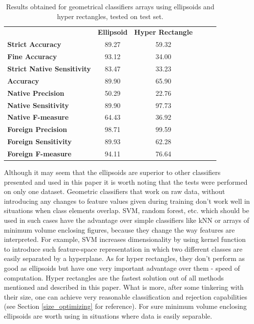 \begin{table}[htp]
	\centering
	\caption{Results obtained for geometrical classifiers arrays using ellipsoids and hyper rectangles, tested on test set.}
	\label{ellipsoid_arrays_results_test}
	\begin{tabular}{l|c|c|lll}
		\cline{2-3}
		& \multicolumn{1}{l|}{\textbf{Ellipsoid}} & \textbf{Hyper Rectangle} &  &  &  \\ \cline{1-3}
		\multicolumn{1}{|l|}{\textbf{Strict Accuracy}}           & 89.27 & 59.32 \\ \cline{1-3}
		\multicolumn{1}{|l|}{\textbf{Fine Accuracy}}             & 93.12 & 34.00 \\ \cline{1-3}
		\multicolumn{1}{|l|}{\textbf{Strict Native Sensitivity}} & 83.47 & 33.23 \\ \cline{1-3}
		\multicolumn{1}{|l|}{\textbf{Accuracy}}                  & 89.90 & 65.90 \\ \cline{1-3}
		\multicolumn{1}{|l|}{\textbf{Native Precision}}          & 50.29 & 22.76 \\ \cline{1-3}
		\multicolumn{1}{|l|}{\textbf{Native Sensitivity}}        & 89.90 & 97.73 \\ \cline{1-3}
		\multicolumn{1}{|l|}{\textbf{Native F-measure}}          & 64.43 & 36.92 \\ \cline{1-3}
		\multicolumn{1}{|l|}{\textbf{Foreign Precision}}         & 98.71 & 99.59 \\ \cline{1-3}
		\multicolumn{1}{|l|}{\textbf{Foreign Sensitivity}}       & 89.93 & 62.28 \\ \cline{1-3}
		\multicolumn{1}{|l|}{\textbf{Foreign F-measure}}         & 94.11 & 76.64 \\ \cline{1-3}
	\end{tabular}
\end{table}

Although it may seem that the ellipsoids are superior to other classifiers presented and used in this paper it is worth noting that the tests were performed on only one dataset. Geometric classifiers that work on raw data, without introducing any changes to feature values given during training don't work well in situations when class elements overlap. SVM, random forest, etc. which should be used in such cases have the advantage over simple classifiers like kNN or arrays of minimum volume enclosing figures, because they change the way features are interpreted. For example, SVM increases dimensionality by using kernel function to introduce such feature-space representation in which two different classes are easily separated by a hyperplane. As for hyper rectangles, they don't perform as good as ellipsoids but have one very important advantage over them - speed of computation. Hyper rectangles are the fastest solution out of all methods mentioned and described in this paper. What is more, after some tinkering with their size, one can achieve very reasonable classification and rejection capabilities (see Section \ref{size_optimizing} for reference). For sure minimum volume enclosing ellipsoids are worth using in situations where data is easily separable.